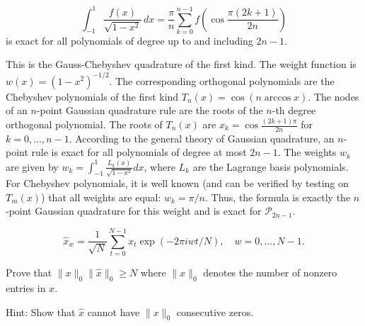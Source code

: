 \begin{exercise}
\label{applied:2014:6}
\[
\int_{-1}^{1}\frac{f(x)}{\sqrt{1-x^{2}}}\,dx=\frac{\pi}{n}\sum_{k=0}^{n-1}f\left(\cos\frac{\pi(2k+1)}{2n}\right)
\]
is exact for all polynomials of degree up to and including $2n-1$.
\end{exercise}

\begin{solution}
This is the Gauss-Chebyshev quadrature of the first kind. The weight function is $w(x) = (1-x^2)^{-1/2}$. The corresponding orthogonal polynomials are the Chebyshev polynomials of the first kind $T_n(x) = \cos(n \arccos x)$. The nodes of an $n$-point Gaussian quadrature rule are the roots of the $n$-th degree orthogonal polynomial. The roots of $T_n(x)$ are $x_k = \cos \frac{(2k+1)\pi}{2n}$ for $k=0, \dots, n-1$.
According to the general theory of Gaussian quadrature, an $n$-point rule is exact for all polynomials of degree at most $2n-1$. The weights $w_k$ are given by $w_k = \int_{-1}^1 \frac{L_k(x)}{\sqrt{1-x^2}} dx$, where $L_k$ are the Lagrange basis polynomials. For Chebyshev polynomials, it is well known (and can be verified by testing on $T_m(x)$) that all weights are equal: $w_k = \pi/n$. Thus, the formula is exactly the $n$-point Gaussian quadrature for this weight and is exact for $\mathcal{P}_{2n-1}$.
\end{solution}

\begin{exercise}
\label{applied:2014:7}
\[
\hat{x}_{w}=\frac{1}{\sqrt{N}}\sum_{t=0}^{N-1}x_{t}\exp(-2\pi iwt/N),\quad w=0,\dots,N-1.
\]

Prove that $\|x\|_{0}\|\hat{x}\|_{0}\geq N$ where $\|x\|_{0}$ denotes the number of nonzero entries in $x$.

Hint: Show that $\hat{x}$ cannot have $\|x\|_{0}$ consecutive zeros.
\end{exercise}

